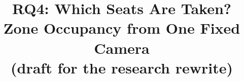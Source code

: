 \documentclass[conference]{IEEEtran}
\begin{document}
\title{RQ4: Which Seats Are Taken? Zone Occupancy from One Fixed Camera\\(draft for the research rewrite)}
\author{}
\maketitle





\end{document}
